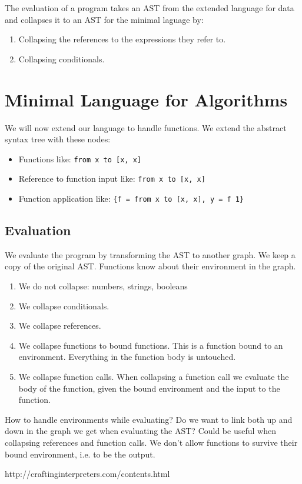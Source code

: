 \documentclass[a4paper,12pt]{article}
\begin{document}
The evaluation of a program takes an AST from the extended language for data and collapses it to an AST for the minimal laguage by:
\begin{enumerate}
\item Collapsing the references to the expressions they refer to.
\item Collapsing conditionals.
\end{enumerate}

\section{Minimal Language for Algorithms}

We will now extend our language to handle functions. We extend the abstract syntax tree with these nodes:
\begin{itemize}
\item Functions like: \lstinline|from x to [x, x]|
\item Reference to function input like: \lstinline|from x to [x, x]|
\item Function application like: \lstinline|{f = from x to [x, x], y = f 1}|
\end{itemize}

\subsection{Evaluation}

We evaluate the program by transforming the AST to another graph. We keep a copy of the original AST. Functions know about their environment in the graph.
\begin{enumerate}
\item We do not collapse: numbers, strings, booleans
\item We collapse conditionals.
\item We collapse references.
\item We collapse functions to bound functions. This is a function bound to an environment. Everything in the function body is untouched.
\item We collapse function calls. When collapsing a function call we evaluate the body of the function, given the bound environment and the input to the function.
\end{enumerate}
How to handle environments while evaluating? Do we want to link both up and down in the graph we get when evaluating the AST? Could be useful when collapsing references and function calls. We don't allow functions to survive their bound environment, i.e. to be the output.

http://craftinginterpreters.com/contents.html
\end{document}
